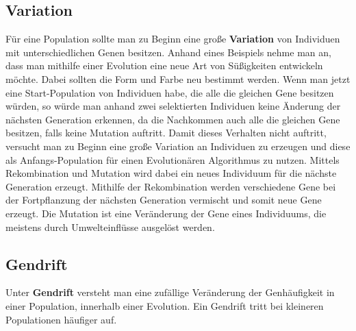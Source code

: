 \subsection{Variation}

F{\"u}r eine Population sollte man zu Beginn eine gro{\ss}e \textbf{Variation} von Individuen mit unterschiedlichen Genen besitzen. 
Anhand eines Beispiels nehme man an, dass man mithilfe einer Evolution eine neue Art von S{\"u}{\ss}igkeiten entwickeln m{\"o}chte. Dabei sollten die Form und Farbe neu bestimmt werden. 
Wenn man jetzt eine Start-Population von Individuen habe, die alle die gleichen Gene besitzen w{\"u}rden, so w{\"u}rde man anhand zwei selektierten Individuen keine {\"A}nderung der n{\"a}chsten Generation erkennen, da die Nachkommen auch alle die gleichen Gene besitzen, falls keine Mutation auftritt.
Damit dieses Verhalten nicht auftritt, versucht man zu Beginn eine gro{\ss}e Variation an Individuen zu erzeugen und diese als Anfangs-Population f{\"u}r einen Evolution{\"a}ren Algorithmus zu nutzen. 
Mittels Rekombination und Mutation wird dabei ein neues Individuum f{\"u}r die n{\"a}chste Generation erzeugt.
Mithilfe der Rekombination werden verschiedene Gene bei der Fortpflanzung der n{\"a}chsten Generation vermischt und somit neue Gene erzeugt. Die Mutation ist eine Ver{\"a}nderung der Gene eines Individuums, die meistens durch Umwelteinfl{\"u}sse ausgel{\"o}st werden. \cite{flickevolutionare} 



\subsection{Gendrift}
Unter \textbf{Gendrift} versteht man eine zuf{\"a}llige Ver{\"a}nderung der Genh{\"a}ufigkeit in einer Population, innerhalb einer Evolution. Ein Gendrift tritt bei kleineren Populationen h{\"a}ufiger auf. \cite{brockhausonline} %


